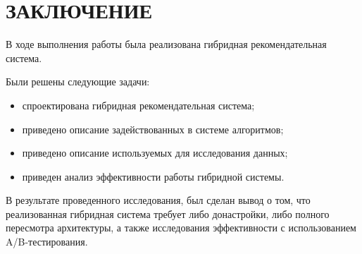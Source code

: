 \section*{ЗАКЛЮЧЕНИЕ}
В ходе выполнения работы была реализована гибридная рекомендательная система.

Были решены следующие задачи:
\begin{itemize}
	\item спроектирована гибридная рекомендательная система;
	\item приведено описание задействованных в системе алгоритмов;
	\item приведено описание используемых для исследования данных;
	\item приведен анализ эффективности работы гибридной системы.
\end{itemize}

В результате проведенного исследования, был сделан вывод о том, что реализованная гибридная система требует либо донастройки, либо полного пересмотра архитектуры, а также исследования эффективности с использованием A/B-тестирования.

\pagebreak